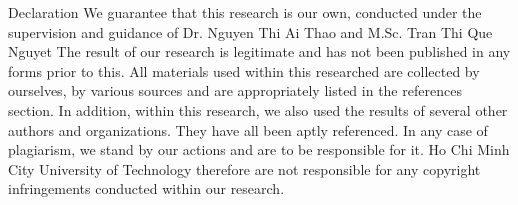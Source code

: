\begin{preface}{Declaration}
  We guarantee that this research is our own, conducted under the supervision and guidance of Dr. Nguyen Thi Ai Thao and M.Sc. Tran Thi Que Nguyet
  The result of our research is legitimate and has not been published in any forms prior to this.
  All materials used within this researched are collected by ourselves, by various sources and are appropriately listed in the references section.
  In addition, within this research, we also used the results of several other authors and organizations.
  They have all been aptly referenced.
  In any case of plagiarism, we stand by our actions and are to be responsible for it.
  Ho Chi Minh City University of Technology therefore are not responsible for any copyright infringements conducted within our research.
\end{preface}

